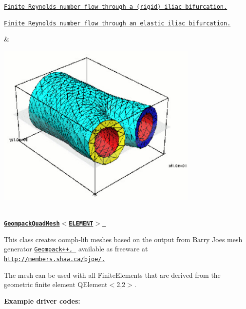 \begin{center}
\begin{longtabu}
\begin{DoxyItemize}
\begin{DoxyItemize}
\item \href{../../../navier_stokes/vmtk_fluid/html/index.html}{\tt Finite Reynolds number flow through a (rigid) iliac bifurcation.} ~\newline
~\newline

\item \href{../../../interaction/vmtk_fsi/html/index.html}{\tt Finite Reynolds number flow through an elastic iliac bifurcation.} ~\newline
~\newline

\end{DoxyItemize}
\end{DoxyItemize}& 
\begin{DoxyImageNoCaption}
  \mbox{\includegraphics[width=0.75\textwidth]{iliac}}
\end{DoxyImageNoCaption}
   \\
\href{../../mesh_from_geompack/html/index.html}{\tt {\bfseries  Geompack\+Quad\+Mesh$<$\+E\+L\+E\+M\+E\+N\+T$>$ }} ~\newline
~\newline

\begin{DoxyItemize}
\item This class creates {\ttfamily oomph-\/lib} meshes based on the output from Barry Joe\textquotesingle{}s mesh generator \href{http://members.shaw.ca/bjoe/}{\tt {\ttfamily Geompack++}, } available as freeware at \href{http://members.shaw.ca/bjoe/}{\tt http\+://members.\+shaw.\+ca/bjoe/.}
\item The mesh can be used with all {\ttfamily Finite\+Elements} that are derived from the geometric finite element {\ttfamily Q\+Element$<$2,2$>$}.
\end{DoxyItemize}{\bfseries Example driver codes\+:} ~\newline


\end{longtabu}
\end{center}

